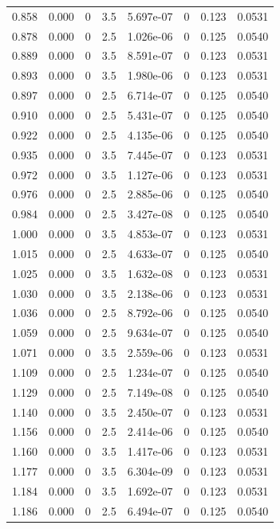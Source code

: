 \documentclass[preview]{standalone}
\begin{document}
{{{\begin{tabular}{L{1.2cm}C{1.2cm} C{0.3cm}C{0.5cm} C{1.4cm}C{1.4cm} C{1.4cm}C{1.4cm}}
  0.858  &  0.000  & 0     & 3.5 &  5.697e-07  & 0  & 0.123 &  0.0531   \\ 
  0.878  &  0.000  & 0     & 2.5 &  1.026e-06  & 0  & 0.125 &  0.0540   \\ 
  0.889  &  0.000  & 0     & 3.5 &  8.591e-07  & 0  & 0.123 &  0.0531   \\ 
  0.893  &  0.000  & 0     & 3.5 &  1.980e-06  & 0  & 0.123 &  0.0531   \\ 
  0.897  &  0.000  & 0     & 2.5 &  6.714e-07  & 0  & 0.125 &  0.0540   \\ 
  0.910  &  0.000  & 0     & 2.5 &  5.431e-07  & 0  & 0.125 &  0.0540   \\ 
  0.922  &  0.000  & 0     & 2.5 &  4.135e-06  & 0  & 0.125 &  0.0540   \\ 
  0.935  &  0.000  & 0     & 3.5 &  7.445e-07  & 0  & 0.123 &  0.0531   \\ 
  0.972  &  0.000  & 0     & 3.5 &  1.127e-06  & 0  & 0.123 &  0.0531   \\ 
  0.976  &  0.000  & 0     & 2.5 &  2.885e-06  & 0  & 0.125 &  0.0540   \\ 
  0.984  &  0.000  & 0     & 2.5 &  3.427e-08  & 0  & 0.125 &  0.0540   \\ 
  1.000  &  0.000  & 0     & 3.5 &  4.853e-07  & 0  & 0.123 &  0.0531   \\ 
  1.015  &  0.000  & 0     & 2.5 &  4.633e-07  & 0  & 0.125 &  0.0540   \\ 
  1.025  &  0.000  & 0     & 3.5 &  1.632e-08  & 0  & 0.123 &  0.0531   \\ 
  1.030  &  0.000  & 0     & 3.5 &  2.138e-06  & 0  & 0.123 &  0.0531   \\ 
  1.036  &  0.000  & 0     & 2.5 &  8.792e-06  & 0  & 0.125 &  0.0540   \\ 
  1.059  &  0.000  & 0     & 2.5 &  9.634e-07  & 0  & 0.125 &  0.0540   \\ 
  1.071  &  0.000  & 0     & 3.5 &  2.559e-06  & 0  & 0.123 &  0.0531   \\ 
  1.109  &  0.000  & 0     & 2.5 &  1.234e-07  & 0  & 0.125 &  0.0540   \\ 
  1.129  &  0.000  & 0     & 2.5 &  7.149e-08  & 0  & 0.125 &  0.0540   \\ 
  1.140  &  0.000  & 0     & 3.5 &  2.450e-07  & 0  & 0.123 &  0.0531   \\ 
  1.156  &  0.000  & 0     & 2.5 &  2.414e-06  & 0  & 0.125 &  0.0540   \\ 
  1.160  &  0.000  & 0     & 3.5 &  1.417e-06  & 0  & 0.123 &  0.0531   \\ 
  1.177  &  0.000  & 0     & 3.5 &  6.304e-09  & 0  & 0.123 &  0.0531   \\ 
  1.184  &  0.000  & 0     & 3.5 &  1.692e-07  & 0  & 0.123 &  0.0531   \\ 
  1.186  &  0.000  & 0     & 2.5 &  6.494e-07  & 0  & 0.125 &  0.0540   \\ 
\hline 
\end{tabular} 

}}}
\end{document}
